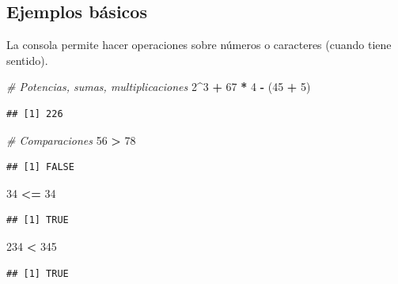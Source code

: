 \documentclass[]{article}
\newenvironment{Shaded}{\begin{snugshade}}{\end{snugshade}}
\newcommand{\DecValTok}[1]{\textcolor[rgb]{0.00,0.00,0.81}{#1}}
\newcommand{\StringTok}[1]{\textcolor[rgb]{0.31,0.60,0.02}{#1}}
\newcommand{\CommentTok}[1]{\textcolor[rgb]{0.56,0.35,0.01}{\textit{#1}}}
\newcommand{\OperatorTok}[1]{\textcolor[rgb]{0.81,0.36,0.00}{\textbf{#1}}}
\newcommand{\NormalTok}[1]{#1}
\begin{document}
\subsection{Ejemplos básicos}\label{ejemplos-basicos}

La consola permite hacer operaciones sobre números o caracteres (cuando
tiene sentido).

\begin{Shaded}
\begin{Highlighting}[]
\CommentTok{# Potencias, sumas, multiplicaciones}
\DecValTok{2}\OperatorTok{^}\DecValTok{3} \OperatorTok{+}\StringTok{ }\DecValTok{67} \OperatorTok{*}\StringTok{ }\DecValTok{4} \OperatorTok{-}\StringTok{ }\NormalTok{(}\DecValTok{45} \OperatorTok{+}\StringTok{ }\DecValTok{5}\NormalTok{)}
\end{Highlighting}
\end{Shaded}

\begin{verbatim}
## [1] 226
\end{verbatim}

\begin{Shaded}
\begin{Highlighting}[]
\CommentTok{# Comparaciones}
\DecValTok{56} \OperatorTok{>}\StringTok{ }\DecValTok{78} 
\end{Highlighting}
\end{Shaded}

\begin{verbatim}
## [1] FALSE
\end{verbatim}

\begin{Shaded}
\begin{Highlighting}[]
\DecValTok{34} \OperatorTok{<=}\StringTok{ }\DecValTok{34}
\end{Highlighting}
\end{Shaded}

\begin{verbatim}
## [1] TRUE
\end{verbatim}

\begin{Shaded}
\begin{Highlighting}[]
\DecValTok{234} \OperatorTok{<}\StringTok{ }\DecValTok{345}
\end{Highlighting}
\end{Shaded}

\begin{verbatim}
## [1] TRUE
\end{verbatim}
\end{document}
